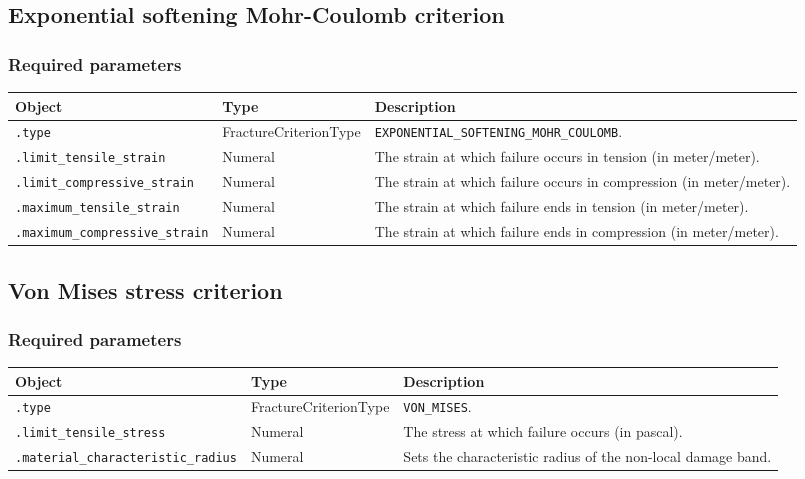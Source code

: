 \documentclass[10pt]{article}
\begin{document}
\subsection{Exponential softening Mohr-Coulomb criterion}

\subsubsection*{Required parameters}

\begin{tabularx}{\textwidth}{llX}
\hline 
Object & Type & Description \\ 
\hline 
\verb+.type+ & FractureCriterionType & \verb+EXPONENTIAL_SOFTENING_MOHR_COULOMB+. \\ 
\verb+.limit_tensile_strain+ & Numeral & The strain at which failure occurs in tension (in meter/meter).\\
\verb+.limit_compressive_strain+ & Numeral & The strain at which failure occurs in compression (in meter/meter).\\
\verb+.maximum_tensile_strain+ & Numeral & The strain at which failure ends in tension (in meter/meter).\\
\verb+.maximum_compressive_strain+ & Numeral & The strain at which failure ends in compression (in meter/meter).\\
\hline 
\end{tabularx}

\subsection{Von Mises stress criterion}

\subsubsection*{Required parameters}

\begin{tabularx}{\textwidth}{llX}
\hline 
Object & Type & Description \\ 
\hline 
\verb+.type+ & FractureCriterionType & \verb+VON_MISES+. \\ 
\verb+.limit_tensile_stress+ & Numeral & The stress at which failure occurs (in pascal).\\
\verb+.material_characteristic_radius+ & Numeral & Sets the characteristic radius of the non-local damage band. \\ 
\hline 
\end{tabularx}
\end{document}
